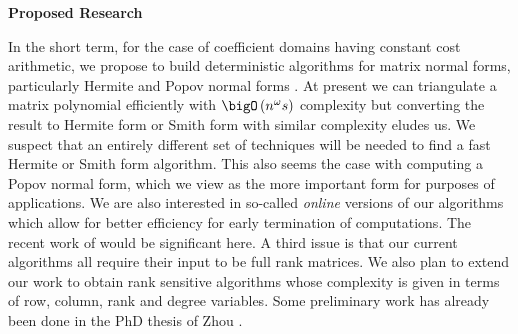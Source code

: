 \bigskip
\noindent
{\bf Proposed Research}
\bigskip

In the short term, for the case of coefficient domains having constant cost arithmetic, we propose to build deterministic algorithms for
matrix normal forms, particularly Hermite and Popov normal forms \cite{popov}. At present we can triangulate a matrix polynomial efficiently with $\bigO\left(n^{\omega}s\right)$ complexity but converting the result to Hermite form or Smith form with similar complexity eludes us.  We suspect that an entirely different set of techniques will be needed to find a fast Hermite or Smith form algorithm. This also seems the case with computing a Popov normal form, which we view as the more important form for purposes of applications. We are also interested in so-called 
{\em online} versions of our algorithms which allow for better efficiency for early termination of computations. The recent work of \cite{giorgi2} would be significant here.
A third issue is that our current algorithms all require their input to be full rank matrices. 
We also plan to extend our work to obtain rank sensitive algorithms whose complexity is given in terms of row, column, rank and degree variables. Some preliminary work has already been done in the PhD thesis of Zhou \cite{zhou:phd2012}.  

